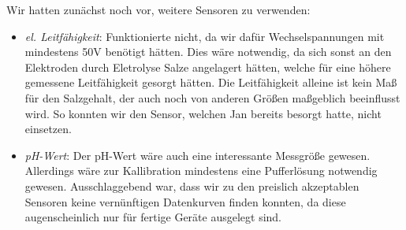 \documentclass[12pt,a4paper,titlepage,headinclude,bibtotoc]{scrartcl}
\begin{document}
Wir hatten zunächst noch vor, weitere Sensoren zu verwenden:
\begin{itemize}
	\item \textit{el. Leitfähigkeit}: Funktionierte nicht, da wir dafür Wechselspannungen mit mindestens 50V benötigt hätten.
		Dies wäre notwendig, da sich sonst an den Elektroden durch Eletrolyse Salze angelagert hätten, welche für eine höhere gemessene Leitfähigkeit gesorgt hätten.
		Die Leitfähigkeit alleine ist kein Maß für den Salzgehalt, der auch noch von anderen Größen maßgeblich beeinflusst wird.
		So konnten wir den Sensor, welchen Jan bereits besorgt hatte, nicht einsetzen.
	\item \textit{pH-Wert}: Der pH-Wert wäre auch eine interessante Messgröße gewesen.
		Allerdings wäre zur Kallibration mindestens eine Pufferlösung notwendig gewesen.
		Ausschlaggebend war, dass wir zu den preislich akzeptablen Sensoren keine vernünftigen Datenkurven finden konnten, da diese augenscheinlich nur für fertige Geräte ausgelegt sind.
\end{itemize}




\end{document}
